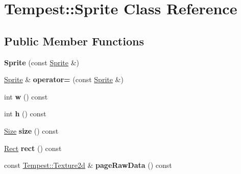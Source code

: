 \hypertarget{class_tempest_1_1_sprite}{\section{Tempest\+:\+:Sprite Class Reference}
\label{class_tempest_1_1_sprite}
}
\subsection*{Public Member Functions}
\begin{DoxyCompactItemize}
\item 
\hypertarget{class_tempest_1_1_sprite_af3700feddc3ee35f077a7bf05dc45e06}{{\bfseries Sprite} (const \hyperlink{class_tempest_1_1_sprite}{Sprite} \&)}\label{class_tempest_1_1_sprite_af3700feddc3ee35f077a7bf05dc45e06}

\item 
\hypertarget{class_tempest_1_1_sprite_aca2261f43f4c856db13fdfa67084af1b}{\hyperlink{class_tempest_1_1_sprite}{Sprite} \& {\bfseries operator=} (const \hyperlink{class_tempest_1_1_sprite}{Sprite} \&)}\label{class_tempest_1_1_sprite_aca2261f43f4c856db13fdfa67084af1b}

\item 
\hypertarget{class_tempest_1_1_sprite_a50831d66faf48f4e795925fa8b0669a8}{int {\bfseries w} () const }\label{class_tempest_1_1_sprite_a50831d66faf48f4e795925fa8b0669a8}

\item 
\hypertarget{class_tempest_1_1_sprite_a50fb98d07f0b0f92ca59c154166d3057}{int {\bfseries h} () const }\label{class_tempest_1_1_sprite_a50fb98d07f0b0f92ca59c154166d3057}

\item 
\hypertarget{class_tempest_1_1_sprite_a755ca39b5efe0baa217037ed6b1ff101}{\hyperlink{struct_tempest_1_1_size}{Size} {\bfseries size} () const }\label{class_tempest_1_1_sprite_a755ca39b5efe0baa217037ed6b1ff101}

\item 
\hypertarget{class_tempest_1_1_sprite_a884e6445b13d367f02641c46f3c6172b}{\hyperlink{struct_tempest_1_1_rect}{Rect} {\bfseries rect} () const }\label{class_tempest_1_1_sprite_a884e6445b13d367f02641c46f3c6172b}

\item 
\hypertarget{class_tempest_1_1_sprite_a76bb2e2f7d60899d9ec061605c2ee8c3}{const \hyperlink{class_tempest_1_1_texture2d}{Tempest\+::\+Texture2d} \& {\bfseries page\+Raw\+Data} () const }\label{class_tempest_1_1_sprite_a76bb2e2f7d60899d9ec061605c2ee8c3}


\end{DoxyCompactItemize}
